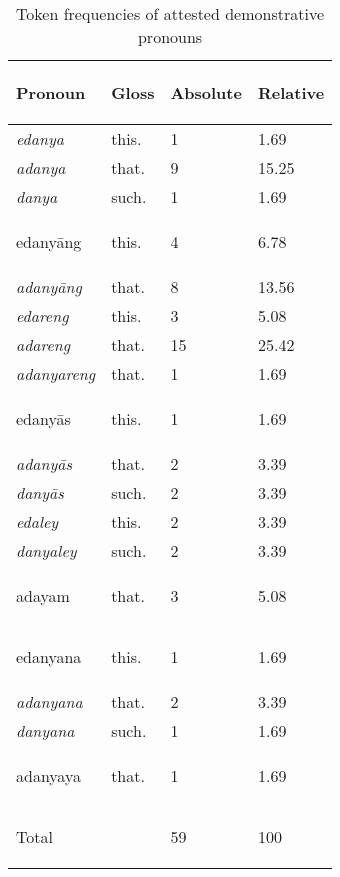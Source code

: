 \begin{table}[tp]\centering
\caption{Token frequencies of attested demonstrative pronouns}

\begin{tabu} to .75
\tableheaderfont\toprule

Pronoun
	& Gloss
	& Absolute
	& Relative
	\\

\toprule

edanya
	& this.\Top{}
	& 1
	& 1.69\pct
	\\

adanya
	& that.\Top{}
	& 9
	& 15.25\pct
	\\

danya
	& such.\Top{}
	& 1
	& 1.69\pct
	\\

\midrule

edanyāng
	& this.\Aarg{}
	& 4
	& 6.78\pct
	\\

adanyāng
	& that.\Aarg{}
	& 8
	& 13.56\pct
	\\

edareng
	& this.\AargI{}
	& 3
	& 5.08\pct
	\\

adareng
	& that.\AargI{}
	& 15
	& 25.42\pct
	\\

adanyareng
	& that.\AargI{}
	& 1
	& 1.69\pct
	\\

\midrule

edanyās
	& this.\Parg{}
	& 1
	& 1.69\pct
	\\

adanyās
	& that.\Parg{}
	& 2
	& 3.39\pct
	\\

danyās
	& such.\Parg{}
	& 2
	& 3.39\pct
	\\

edaley
	& this.\PargI{}
	& 2
	& 3.39\pct
	\\

danyaley
	& such.\PargI{}
	& 2
	& 3.39\pct
	\\

\midrule

adayam
	& that.\Dat{}
	& 3
	& 5.08\pct
	\\

\midrule

edanyana
	& this.\Gen{}
	& 1
	& 1.69\pct
	\\

adanyana
	& that.\Gen{}
	& 2
	& 3.39\pct
	\\

danyana
	& such.\Gen{}
	& 1
	& 1.69\pct
	\\

\midrule

adanyaya
	& that.\Loc{}
	& 1
	& 1.69\pct
	\\

\bottomrule

\textup{Total}
	& 
	& 59
	& 100\pct
	\\

\bottomrule
\end{tabu}
\label{tab:detprontokenfq}
\end{table}

